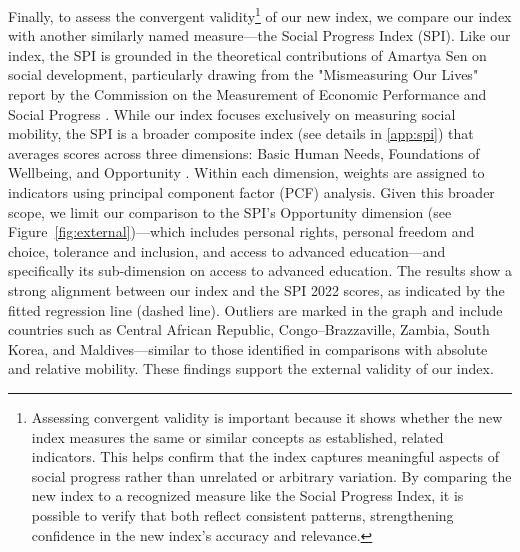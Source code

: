 Finally, to assess the convergent validity\footnote{Assessing convergent validity is important because it shows whether the new index measures the same or similar concepts as established, related indicators. This helps confirm that the index captures meaningful aspects of social progress rather than unrelated or arbitrary variation. By comparing the new index to a recognized measure like the Social Progress Index, it is possible to verify that both reflect consistent patterns, strengthening confidence in the new index's accuracy and relevance.} of our new index, we compare our index with another similarly named measure---the Social Progress Index (SPI). Like our index, the SPI is grounded in the theoretical contributions of Amartya Sen on social development, particularly drawing from the "Mismeasuring Our Lives" report by the Commission on the Measurement of Economic Performance and Social Progress \citep{stiglitz2010mismeasuring}. While our index focuses exclusively on measuring social mobility, the SPI is a broader composite index (see details in \ref{app:spi}) that averages scores across three dimensions: Basic Human Needs, Foundations of Wellbeing, and Opportunity \citep{krylova2025social}. Within each dimension, weights are assigned to indicators using principal component factor (PCF) analysis. Given this broader scope, we limit our comparison to the SPI's Opportunity dimension (see Figure~\ref{fig:external})---which includes personal rights, personal freedom and choice, tolerance and inclusion, and access to advanced education---and specifically its sub-dimension on access to advanced education. The results show a strong alignment between our index and the SPI 2022 scores, as indicated by the fitted regression line (dashed line). Outliers are marked in the graph and include countries such as Central African Republic, Congo--Brazzaville, Zambia, South Korea, and Maldives---similar to those identified in comparisons with absolute and relative mobility. These findings support the external validity of our index.

